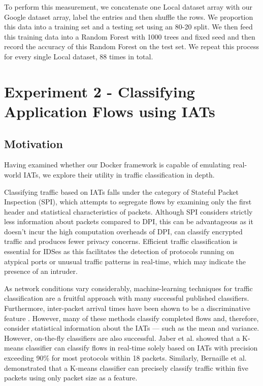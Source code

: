 \documentclass[msc,deptreport, cs]{infthesis} %
\begin{document}
To perform this measurement, we concatenate one Local dataset array with our Google dataset array, label the entries and then shuffle the rows. We proportion this data into a training set and a testing set using an 80-20 split. We then feed this training data into a Random Forest with 1000 trees and fixed seed and then record the accuracy of this Random Forest on the test set. We repeat this process for every single Local dataset, 88 times in total.

\section{Experiment 2 - Classifying Application Flows using IATs}

\subsection{Motivation}

Having examined whether our Docker framework is capable of emulating real-world IATs, we explore their utility in traffic classification in depth. 

Classifying traffic based on IATs falls under the category of Stateful Packet Inspection (SPI), which attempts to segregate flows by examining only the first header and statistical characteristics of packets. Although SPI considers strictly less information about packets compared to DPI, this can be advantageous as it doesn't incur the high computation overheads of DPI, can classify encrypted traffic and produces fewer privacy concerns. Efficient traffic classification is essential for IDSes as this facilitates the detection of protocols running on atypical ports or unusual traffic patterns in real-time, which may indicate the presence of an intruder.

As network conditions vary considerably, machine-learning techniques for traffic classification are a fruitful approach with many successful published classifiers. Furthermore, inter-packet arrival times have been shown to be a discriminative feature \cite{zander2005automated} \cite{nguyen2008survey}. However, many of these methods classify completed flows and, therefore, consider statistical information about the IATs --- such as the mean and variance. However, on-the-fly classifiers are also successful. Jaber et al. \cite{jaber2011can} showed that a K-means classifier can classify flows in real-time solely based on IATs with precision exceeding 90\% for most protocols within 18 packets. Similarly, Bernaille et al. \cite{bernaille2006traffic} demonstrated that a K-means classifier can precisely classify traffic within five packets using only packet size as a feature. 
\end{document}
